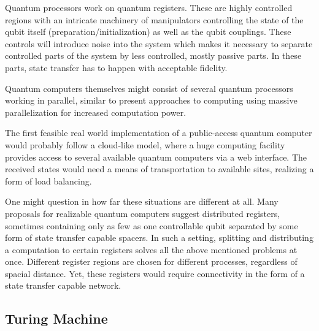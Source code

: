 \begin{center}
\end{center}

\noindent Quantum processors work on quantum registers. These are highly controlled regions with an intricate machinery of manipulators controlling the state of the qubit itself (preparation/initialization) as well as the qubit couplings. These controls will introduce noise into the system which makes it necessary to separate controlled parts of the system by less controlled, mostly passive parts\cite{Bose2014}. In these parts, state transfer has to happen with acceptable fidelity.\par
Quantum computers themselves might consist of several quantum processors working in parallel, similar to present approaches to computing using massive parallelization for increased computation power.\par
The first feasible real world implementation of a public-access quantum computer would probably follow a cloud-like model, where a huge computing facility provides access to several available quantum computers via a web interface. The received states would need a means of transportation to available sites, realizing a form of load balancing.\par
One might question in how far these situations are different at all. Many proposals for realizable quantum computers suggest distributed registers, sometimes containing only as few as one controllable qubit separated by some form of state transfer capable spacers\cite{Beals2013}. In such a setting, splitting and distributing a computation to certain registers solves all the above mentioned problems at once. Different register regions are chosen for different processes, regardless of spacial distance. Yet, these registers would require connectivity in the form of a state transfer capable network. 

\subsection{Turing Machine}

